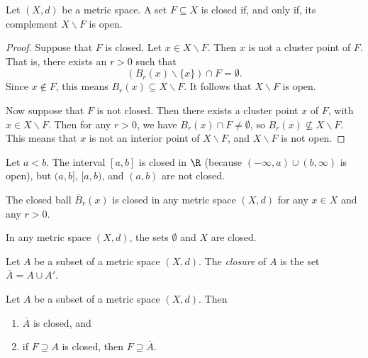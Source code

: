 \begin{theorem} \label{thm:complement}
Let $(X,d)$ be a metric space. A set $F \subseteq X$ is closed if, and only if, its complement
$X \backslash F$ is open.
\end{theorem}

\np

\begin{proof}
Suppose that $F$ is closed. Let $x \in X \backslash F$. Then $x$ is not a cluster point of $F$.
That is, there exists an $r > 0$ such that
\[
(B_r(x) \backslash \{x\}) \cap F = \emptyset.
\]
Since $x \not\in F$, this means $B_r(x) \subseteq X \backslash F$. It follows that
$X \backslash F$ is open.

Now suppose that $F$ is not closed. Then there exists a cluster point $x$ of $F$, with 
$x \in X \backslash F$. Then for any $r > 0$, we have $B_r(x) \cap F \not= \emptyset$,
so $B_r(x) \not\subseteq X \backslash F$. This means that $x$ is not an interior point
of $X \backslash F$, and $X \backslash F$ is not open.
\end{proof}


\begin{example}
Let $a < b$. The interval $[a,b]$ is closed in $\R$ (because $(-\infty,a) \cup (b,\infty)$ is open),
but $(a,b]$, $[a,b)$, and $(a,b)$ are not closed.
\end{example}


\begin{example}
The closed ball $\overline{B}_r(x)$ is closed in any metric space $(X,d)$ for any $x \in X$ and any $r > 0$.
\end{example}

\begin{example}
In any metric space $(X,d)$, the sets $\emptyset$ and $X$ are closed.
\end{example}

\begin{definition}[Closure]
Let $A$ be a subset of a metric space $(X,d)$. The \emph{closure} of $A$
is the set $\overline{A} = A \cup A'$.
\end{definition}

\begin{theorem} \label{thm:closure}
Let $A$ be a subset of a metric space $(X,d)$. Then
\begin{enumerate}
\item \label{item1.3.2.i} $\overline{A}$ is closed, and
\item \label{item1.3.2.ii} if $F \supseteq A$ is closed, then $F \supseteq \overline{A}$.
\end{enumerate}
\end{theorem}

